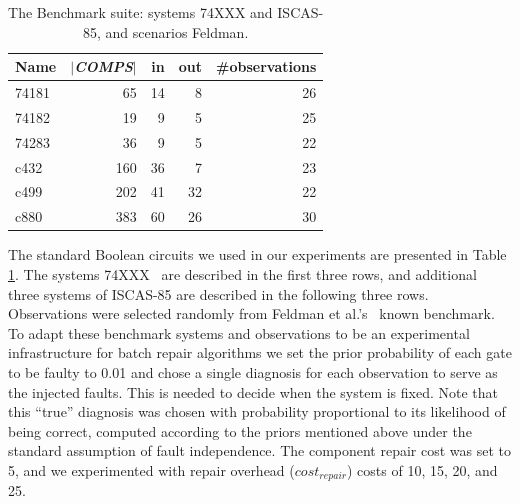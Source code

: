 \documentclass[review]{elsarticle}
\newcommand{\COMPS}{\textit{COMPS}}
\newcommand{\shortcite}{\cite}
\begin{document}
\begin{table}\centering
{\small
\begin{tabular}{|l|r|r|r|r|}
\hline
 {\bf Name} & {\bf $|${\tiny \COMPS}$|$} & {\bf in} & {\bf out} & {\bf \#observations} \\
\hline
    74181  & 65    & 14   & 8    & 26 \\
    74182  & 19    & 9    & 5    & 25 \\
    74283  & 36    & 9    & 5    & 22 \\
\hline
    c432   & 160   & 36   & 7    & 23\\
    c499   & 202   & 41   & 32   & 22\\
    c880   & 383   & 60   & 26   &  30\\
\hline
\end{tabular}
\caption{The Benchmark suite: systems  {\small 74XXX} and
         {\small ISCAS-85}, and scenarios Feldman.}
\label{tab:systems}
}
\end{table}%

The standard Boolean circuits we used in our experiments are presented in Table \ref{tab:systems}. The systems {\small 74XXX}~\cite{Hansen99} are described in the first three rows, and additional three systems of {\small ISCAS-85} \cite{Brglez89} are described in the following three rows. Observations were selected randomly from Feldman et al.'s~\shortcite{feldman2010approximate} known benchmark.
To adapt these benchmark systems and observations to be an experimental infrastructure for batch repair algorithms we set the prior probability of each gate to be faulty to 0.01 and chose a single diagnosis for each observation to serve as the injected faults. This is needed to decide when the system is fixed. Note that this ``true'' diagnosis was chosen with probability proportional to its likelihood of being correct, computed according to the priors mentioned above under the standard assumption of fault independence. The component repair cost was set to 5, and we experimented with repair overhead ($cost_{repair}$) costs of 10, 15, 20, and 25.

\end{document}
